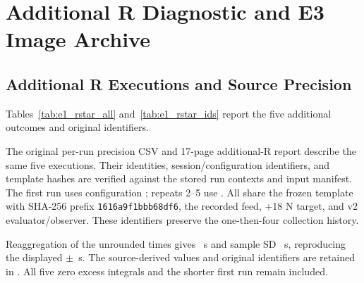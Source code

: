 \chapter{Additional R Diagnostic and E3 Image Archive}
\label{app:e3_archive}

\section{Additional R Executions and Source Precision}
Tables~\ref{tab:e1_rstar_all} and~\ref{tab:e1_rstar_ids} report the five additional outcomes and original identifiers.
\begin{table}[tbp]\centering\footnotesize
\caption[Additional R diagnostic runs]{All five \(R^{*}\) executions on 19 October, calculated from unrounded source CSVs and displayed to three decimals. The first diagnostic precedes four extension runs. These do not replace the original R1--R5. Time is first automatic procedure completion; pass speed uses the successful loaded-pass support.}
\label{tab:e1_rstar_all}
\end{table}

The original per-run precision CSV and 17-page additional-R report describe the same five executions. Their identities, session/configuration identifiers, and template hashes are verified against the stored run contexts and input manifest. The first run uses configuration ; repeats 2--5 use . All share the frozen template with SHA-256 prefix \texttt{1616a9f1bbb68df6}, the recorded feed, +18 N target, and v2 evaluator/observer. These identifiers preserve the one-then-four collection history.

\begin{table}[tbp]\centering\small
\caption[Original additional-R run identifiers]{Original identifiers for the additional \(R^{*}\) cohort. Full configuration and input hashes are supplied in the results manifest.}
\label{tab:e1_rstar_ids}
\end{table}

Reaggregation of the unrounded times gives \RstarTimeMeanPrecision~s and sample SD \RstarTimeSDPrecision~s, reproducing the displayed \EoneRstarTime\(\pm\)\EoneRstarTimeSD~s. The source-derived values and original identifiers are retained in . All five zero excess integrals and the shorter first run remain included.

